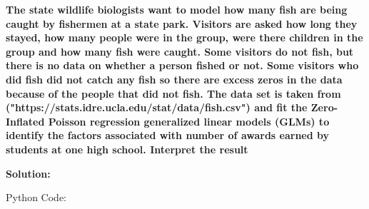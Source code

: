 \documentclass[12pt]{article}
\begin{document}
\vspace{0.4cm}
\textbf{The state wildlife biologists want to model how many fish are being caught by fishermen at a state park. Visitors are asked how long they stayed, how many people were in the group, were there children in the group and how many fish were caught. Some visitors do not fish, but there is no data on whether a person fished or not. Some visitors who did fish did not catch any fish so there are excess zeros in the data because of the people that did not fish. The data set is taken from ("https://stats.idre.ucla.edu/stat/data/fish.csv") and fit the Zero-Inflated Poisson regression generalized linear models (GLMs) to identify the factors associated with number of awards earned by students at one high school. Interpret the result}

\vspace{0.4cm}

{\large\textbf{Solution:}}

\vspace{0.1cm}

{\large{Python Code:}}

\vspace{0.2cm}
\end{document}
